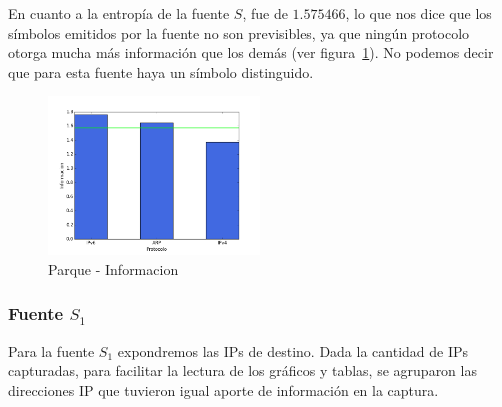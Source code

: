 \documentclass[final,inline,narroweqnarray,a4paper]{ieee}
\begin{document}
En cuanto a la entropía de la fuente $S$, fue de $1.575466$, lo que nos dice que los símbolos emitidos por la fuente no son previsibles, ya que ningún protocolo otorga mucha más información que los demás (ver figura~\ref{histo:parqueS}). No podemos decir que para esta fuente haya un símbolo distinguido.

\begin{figure}[H]
    \begin{center}
        \includegraphics[width=0.5\textwidth]{plot/parqueS-bar.png}
        \caption{Parque - Informacion}
        \label{histo:parqueS}
    \end{center}
\end{figure}

\subsubsection{Fuente $S_1$}

Para la fuente $S_1$ expondremos las IPs de destino. Dada la cantidad de IPs capturadas, para facilitar la lectura de los gráficos y tablas, se agruparon las direcciones IP que tuvieron igual aporte de información en la captura.
\end{document}

